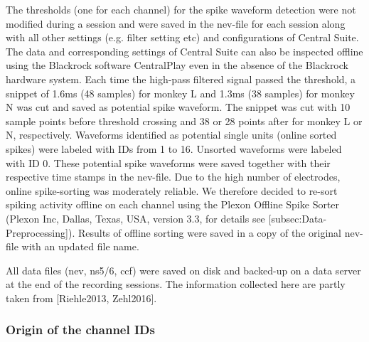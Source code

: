 {The thresholds (one for each channel) for the spike waveform detection were not modified during a session and were saved in the nev-file for each session along with all other settings (e.g. filter setting etc) and configurations of Central Suite. The data and corresponding settings of Central Suite can also be inspected offline using the Blackrock software CentralPlay even in the absence of the Blackrock hardware system. Each time the high-pass filtered signal passed the threshold, a snippet of 1.6ms (48 samples) for monkey L and 1.3ms (38 samples) for monkey N was cut and saved as potential spike waveform. The snippet was cut with 10 sample points before threshold crossing and 38 or 28 points after for monkey L or N, respectively. Waveforms identified as potential single units (online sorted spikes) were labeled with IDs from 1 to 16. Unsorted waveforms were labeled with ID 0. These potential spike waveforms were saved together with their respective time stamps in the nev-file. Due to the high number of electrodes, online spike-sorting was moderately reliable. We therefore decided to re-sort spiking activity offline on each channel using the Plexon Offline Spike Sorter (Plexon Inc, Dallas, Texas, USA, version 3.3, for details see [subsec:Data-Preprocessing]). Results of offline sorting were saved in a copy of the original nev-file with an updated file name. 

All data files (nev, ns5/6, ccf) were saved on disk and backed-up on a data server at the end of the recording sessions. The information collected here are partly taken from [Riehle2013, Zehl2016].





\subsubsection{Origin of the channel IDs}

}
